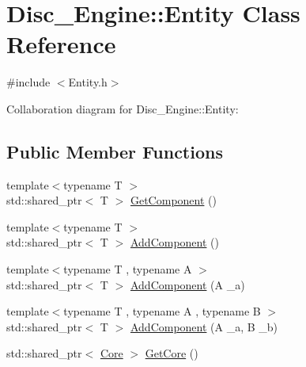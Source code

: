 \hypertarget{class_disc___engine_1_1_entity}{}\section{Disc\+\_\+\+Engine\+:\+:Entity Class Reference}
\label{class_disc___engine_1_1_entity}


{\ttfamily \#include $<$Entity.\+h$>$}



Collaboration diagram for Disc\+\_\+\+Engine\+:\+:Entity\+:
\subsection*{Public Member Functions}
\begin{DoxyCompactItemize}
\item 
{\footnotesize template$<$typename T $>$ }\\std\+::shared\+\_\+ptr$<$ T $>$ \mbox{\hyperlink{class_disc___engine_1_1_entity_a624aeeec279e9e8240d47c3c892e01e3}{Get\+Component}} ()
\item 
{\footnotesize template$<$typename T $>$ }\\std\+::shared\+\_\+ptr$<$ T $>$ \mbox{\hyperlink{class_disc___engine_1_1_entity_ace00927f41d6171967ad0995ecb7d7cf}{Add\+Component}} ()
\item 
{\footnotesize template$<$typename T , typename A $>$ }\\std\+::shared\+\_\+ptr$<$ T $>$ \mbox{\hyperlink{class_disc___engine_1_1_entity_aa5629b9b1fe8d7e3def0eb3beaf6354c}{Add\+Component}} (A \+\_\+a)
\item 
{\footnotesize template$<$typename T , typename A , typename B $>$ }\\std\+::shared\+\_\+ptr$<$ T $>$ \mbox{\hyperlink{class_disc___engine_1_1_entity_abd045796acccdfac53383b50f3020129}{Add\+Component}} (A \+\_\+a, B \+\_\+b)
\item 
std\+::shared\+\_\+ptr$<$ \mbox{\hyperlink{class_disc___engine_1_1_core}{Core}} $>$ \mbox{\hyperlink{class_disc___engine_1_1_entity_aca8a5ff6e980db6f834d841a73dfbf89}{Get\+Core}} ()
\end{DoxyCompactItemize}
